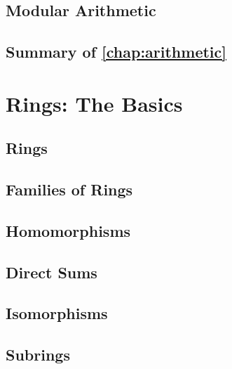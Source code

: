 \documentclass{memoir}
\begin{document}
    \section{Modular Arithmetic}
      \label{sec:int-mod-n}
      
      \newpage

    \section*{Summary of \autoref{chap:arithmetic}}
      


  \chapter{Rings: The Basics}
    \label{chap:rings}
    
    \newpage

    \section{Rings}
      \label{sec:rings}
      
      \newpage

    \section{Families of Rings}
      \label{sec:ring-fams}
      
      \newpage

    \section{Homomorphisms}
      \label{sec:ring-homs}
      
      \newpage

    \section{Direct Sums}
      \label{sec:direct-sums}
      
      \newpage

    \section{Isomorphisms}
      \label{sec:ring-isos}
      
      \newpage

    \section{Subrings}
      \label{sec:subrings}
      
      \newpage
\end{document}
